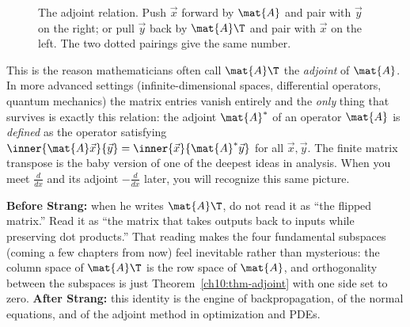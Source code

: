 \begin{figure}[H]
\centering
{}
\caption{The adjoint relation. Push $\vec{x}$ forward by $\mat{A}$ and pair with $\vec{y}$ on the
right; or pull $\vec{y}$ back by $\mat{A}\T$ and pair with $\vec{x}$ on the left. The two dotted
pairings give the same number.}
\label{ch10:fig-adjoint}
\end{figure}

\begin{aestheticbox}
This is the reason mathematicians often call $\mat{A}\T$ the \emph{adjoint} of $\mat{A}$. In more
advanced settings (infinite-dimensional spaces, differential operators, quantum mechanics) the
matrix entries vanish entirely and the \emph{only} thing that survives is exactly this relation:
the adjoint $\mat{A}^{*}$ of an operator $\mat{A}$ is \emph{defined} as the operator satisfying
$\inner{\mat{A}\vec{x}}{\vec{y}}=\inner{\vec{x}}{\mat{A}^{*}\vec{y}}$ for all $\vec{x},\vec{y}$. The
finite matrix transpose is the baby version of one of the deepest ideas in analysis. When you meet
$\frac{d}{dx}$ and its adjoint $-\frac{d}{dx}$ later, you will recognize this same picture.
\end{aestheticbox}

\begin{strangbox}
\textbf{Before Strang:} when he writes $\mat{A}\T$, do not read it as ``the flipped matrix.'' Read
it as ``the matrix that takes outputs back to inputs while preserving dot products.'' That reading
makes the four fundamental subspaces (coming a few chapters from now) feel inevitable rather than
mysterious: the column space of $\mat{A}\T$ is the row space of $\mat{A}$, and orthogonality between
the subspaces is just Theorem~\ref{ch10:thm-adjoint} with one side set to zero. \textbf{After
Strang:} this identity is the engine of backpropagation, of the normal equations, and of the
adjoint method in optimization and PDEs.
\end{strangbox}

